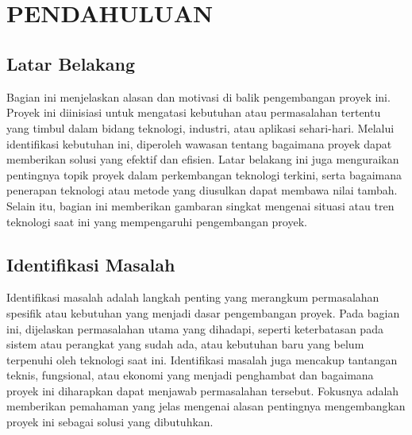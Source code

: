 
\chapter[PENDAHULUAN]{\\ PENDAHULUAN}

\section{Latar Belakang}
Bagian ini menjelaskan alasan dan motivasi di balik pengembangan proyek ini. Proyek ini diinisiasi untuk mengatasi kebutuhan atau permasalahan tertentu yang timbul dalam bidang teknologi, industri, atau aplikasi sehari-hari. Melalui identifikasi kebutuhan ini, diperoleh wawasan tentang bagaimana proyek dapat memberikan solusi yang efektif dan efisien. Latar belakang ini juga menguraikan pentingnya topik proyek dalam perkembangan teknologi terkini, serta bagaimana penerapan teknologi atau metode yang diusulkan dapat membawa nilai tambah. Selain itu, bagian ini memberikan gambaran singkat mengenai situasi atau tren teknologi saat ini yang mempengaruhi pengembangan proyek.

\section{Identifikasi Masalah}
Identifikasi masalah adalah langkah penting yang merangkum permasalahan spesifik atau kebutuhan yang menjadi dasar pengembangan proyek. Pada bagian ini, dijelaskan permasalahan utama yang dihadapi, seperti keterbatasan pada sistem atau perangkat yang sudah ada, atau kebutuhan baru yang belum terpenuhi oleh teknologi saat ini. Identifikasi masalah juga mencakup tantangan teknis, fungsional, atau ekonomi yang menjadi penghambat dan bagaimana proyek ini diharapkan dapat menjawab permasalahan tersebut. Fokusnya adalah memberikan pemahaman yang jelas mengenai alasan pentingnya mengembangkan proyek ini sebagai solusi yang dibutuhkan.

